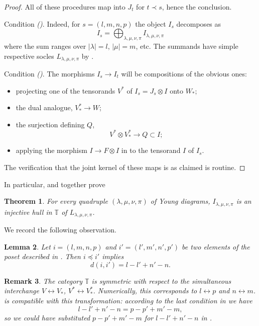 \documentclass[11pt]{article}
\theoremstyle{plain}
\newtheorem{lemma}{Lemma}[section]
\newtheorem{theorem}[lemma]{Theorem}
\theoremstyle{nonumberplain}
\theoremstyle{plain}
\newtheorem{remark}[lemma]{Remark}
\numberwithin{equation}{section}
\theoremstyle{nonumberplain}
\newtheorem{proof}{Proof}
\newcommand\bT{{\mathbb T}}
\newcommand\1{{\bf 1}}
\begin{document}
\begin{proof}
  All of these procedures map into $J_t$ for $t\prec s$, hence the conclusion.

  {Condition \emph{()}.} Indeed, for $s=(l,m,n,p)$ the object $I_s$ decomposes as
  \begin{equation*}
    I_s = \bigoplus_{\lambda,\mu,\nu,\pi}I_{\lambda,\mu,\nu,\pi}
  \end{equation*}
  where the sum ranges over $|\lambda|=l$, $|\mu|=m$, etc. The summands have simple respective socles $L_{\lambda,\mu,\nu,\pi}$ by . 

  {Condition \emph{()}.} The morphisms $I_s\to I_t$ will be compositions of the obvious ones:
  \begin{itemize}
  \item[$-$] projecting one of the tensorands $V^*$ of $I_s=J_s\otimes I$ onto $W_*$;
  \item[$-$] the dual analogue, $V^*_*\to W$;
  \item[$-$] the surjection defining $Q$,%
    \begin{equation}\label{eq:partpair}
      V^*\otimes V^*_*\to Q\subset I;
    \end{equation}
  \item[$-$] applying the morphism $I\to F\otimes I$ in  to the tensorand $I$ of $I_s$. 
  \end{itemize}
  The verification that the joint kernel of these maps is as claimed is routine.  
\end{proof}

In particular, \cite[Proposition 2.5]{us1} and  together prove

\begin{theorem}\label{thm:hulls}
  For every quadruple $(\lambda,\mu,\nu,\pi)$ of Young diagrams, $I_{\lambda,\mu,\nu,\pi}$ is an injective hull in $\mathbb{T}$ of $L_{\lambda,\mu,\nu,\pi}$.
\end{theorem}

We record the following observation.

\begin{lemma}\label{le.defct}
  Let $i=(l,m,n,p)$ and $i'=(l',m',n',p')$ be two elements of the poset described in . Then $i\preceq i'$ implies
  \begin{equation*}
    d(i,i') = l-l' + n'-n.
  \end{equation*}
\end{lemma}


\begin{remark}\label{re.symmetry}
  The category $\bT$ is symmetric with respect to the simultaneous interchange $V \leftrightarrow V_*$, $V^*\leftrightarrow V_*^*$. Numerically, this corresponds to $l\leftrightarrow p$ and $n\leftrightarrow m$.  is compatible with this transformation: according to the last condition in  we have
  \begin{equation*}
    l-l' + n'-n = p-p' + m'-m,
  \end{equation*}
  so we could have substituted $p-p' + m'-m$  %
  for %
  $l-l' + n'-n$ in . 
\end{remark}
\end{document}

